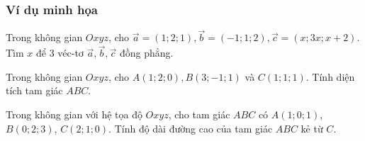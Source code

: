 \subsubsection{Ví dụ minh họa}
\begin{vd}%
	Trong không gian $ Oxyz $, cho $ \vec{a} = (1;2;1), \vec{b} = (-1;1;2), \vec{c} = (x;3x;x+2) $. Tìm $x$ để  $ 3 $ véc-tơ $ \vec{a}, \vec{b}, \vec{c} $ đồng phẳng.	
\end{vd}
\begin{vd}%
	Trong không gian $ Oxyz $, cho $ A(1;2;0), B(3;-1;1) $	và $ C(1;1;1) $. Tính diện tích tam giác $ ABC $.
\end{vd}
\begin{vd}%
	Trong không gian với hệ tọa độ $Oxyz$, cho tam giác $ABC$ có $A\left(1;0;1\right)$, $B\left(0;2;3\right)$, $C\left(2;1;0\right)$. Tính độ dài đường cao của tam giác $ABC$ kẻ từ $C$.
\end{vd}


